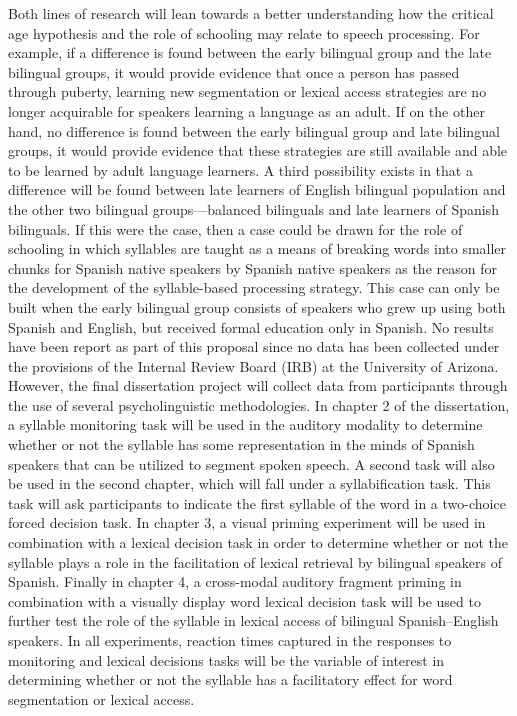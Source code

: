 Both lines of research will lean towards a better understanding how the critical age hypothesis and the role of schooling may relate to speech processing. For example, if a difference is found between the early bilingual group and the late bilingual groups, it would provide evidence that once a person has passed through puberty, learning new segmentation or lexical access strategies are no longer acquirable for speakers learning a language as an adult. If on the other hand, no difference is found between the early bilingual group and late bilingual groups, it would provide evidence that these strategies are still available and able to be learned by adult language learners. A third possibility exists in that a difference will be found between late learners of English bilingual population and the other two bilingual groups—balanced bilinguals and late learners of Spanish bilinguals. If this were the case, then a case could be drawn for the role of schooling in which syllables are taught as a means of breaking words into smaller chunks for Spanish native speakers by Spanish native speakers as the reason for the development of the syllable-based processing strategy. This case can only be built when the early bilingual group consists of speakers who grew up using both Spanish and English, but received formal education only in Spanish.
No results have been report as part of this proposal since no data has been collected under the provisions of the Internal Review Board (IRB) at the University of Arizona. However, the final dissertation project will collect data from participants through the use of several psycholinguistic methodologies. In chapter 2 of the dissertation, a syllable monitoring task will be used in the auditory modality to determine whether or not the syllable has some representation in the minds of Spanish speakers that can be utilized to segment spoken speech. A second task will also be used in the second chapter, which will fall under a syllabification task. This task will ask participants to indicate the first syllable of the word in a two-choice forced decision task. In chapter 3, a visual priming experiment will be used in combination with a lexical decision task in order to determine whether or not the syllable plays a role in the facilitation of lexical retrieval by bilingual speakers of Spanish. Finally in chapter 4, a cross-modal auditory fragment priming in combination with a visually display word lexical decision task will be used to further test the role of the syllable in lexical access of bilingual Spanish–English speakers. In all experiments, reaction times captured in the responses to monitoring and lexical decisions tasks will be the variable of interest in determining whether or not the syllable has a facilitatory effect for word segmentation or lexical access.


